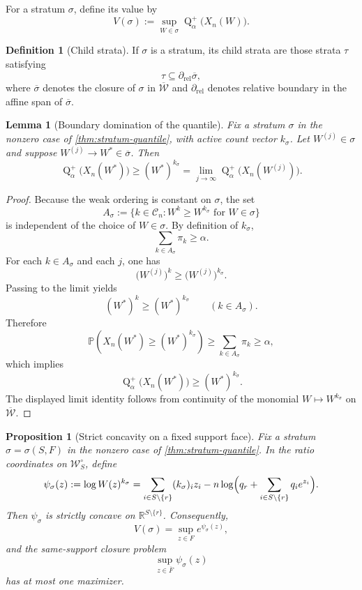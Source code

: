 \documentclass[11pt]{article}
\newtheorem{proposition}[proposition]{Proposition}
\newtheorem{lemma}[lemma]{Lemma}
\theoremstyle{definition}
\newtheorem{definition}[definition]{Definition}
\newcommand{\R}{\mathbb{R}}
\newcommand{\Prob}{\mathbb{P}}
\newcommand{\1}{\mathbf{1}}
\newcommand{\Quant}{\operatorname{Q}}
\begin{document}
For a stratum $\sigma$, define its value by
\[
V(\sigma):=\sup_{W\in\sigma}\Quant_\alpha^+\bigl(X_n(W)\bigr).
\]

\begin{definition}[Child strata]
If $\sigma$ is a stratum, its child strata are those strata $\tau$ satisfying
\[
\tau\subseteq \partial_{\mathrm{rel}}\overline{\sigma},
\]
where $\overline{\sigma}$ denotes the closure of $\sigma$ in $\overline{\mathcal W}$ and $\partial_{\mathrm{rel}}$ denotes relative boundary in the affine span of $\overline{\sigma}$.
\end{definition}

\begin{lemma}[Boundary domination of the quantile]\label{lem:boundary-domination}
Fix a stratum $\sigma$ in the nonzero case of \cref{thm:stratum-quantile}, with active count vector $k_\sigma$. Let $W^{(j)}\in\sigma$ and suppose $W^{(j)}\to W^*\in\overline{\sigma}$. Then
\[
\Quant_\alpha^+\bigl(X_n(W^*)\bigr)\ge (W^*)^{k_\sigma}
=
\lim_{j\to\infty}\Quant_\alpha^+\bigl(X_n(W^{(j)})\bigr).
\]
\end{lemma}

\begin{proof}
Because the weak ordering is constant on $\sigma$, the set
\[
A_\sigma:=\{k\in\mathcal C_n: W^k\ge W^{k_\sigma}\text{ for }W\in\sigma\}
\]
is independent of the choice of $W\in\sigma$. By definition of $k_\sigma$,
\[
\sum_{k\in A_\sigma}\pi_k\ge \alpha.
\]
For each $k\in A_\sigma$ and each $j$, one has
\[
\bigl(W^{(j)}\bigr)^k\ge \bigl(W^{(j)}\bigr)^{k_\sigma}.
\]
Passing to the limit yields
\[
(W^*)^k\ge (W^*)^{k_\sigma}
\qquad (k\in A_\sigma).
\]
Therefore
\[
\Prob\!\left(X_n(W^*)\ge (W^*)^{k_\sigma}\right)
\ge
\sum_{k\in A_\sigma}\pi_k
\ge \alpha,
\]
which implies
\[
\Quant_\alpha^+\bigl(X_n(W^*)\bigr)\ge (W^*)^{k_\sigma}.
\]
The displayed limit identity follows from continuity of the monomial $W\mapsto W^{k_\sigma}$ on $\overline{\mathcal W}$.
\end{proof}

\begin{proposition}[Strict concavity on a fixed support face]\label{prop:strict-concavity}
Fix a stratum $\sigma=\sigma(S,F)$ in the nonzero case of \cref{thm:stratum-quantile}. In the ratio coordinates on $\mathcal W_S^\circ$, define
\begin{equation}\label{eq:psi-def}
\psi_\sigma(z)
:=
\log W(z)^{k_\sigma}
=
\sum_{i\in S\setminus\{r\}} (k_\sigma)_i z_i
-
n\log\Bigl(q_r+\sum_{i\in S\setminus\{r\}} q_i e^{z_i}\Bigr).
\end{equation}
Then $\psi_\sigma$ is strictly concave on $\R^{S\setminus\{r\}}$. Consequently,
\[
V(\sigma)=\sup_{z\in F} e^{\psi_\sigma(z)},
\]
and the same-support closure problem
\[
\sup_{z\in \overline F}\psi_\sigma(z)
\]
has at most one maximizer.
\end{proposition}
\end{document}
